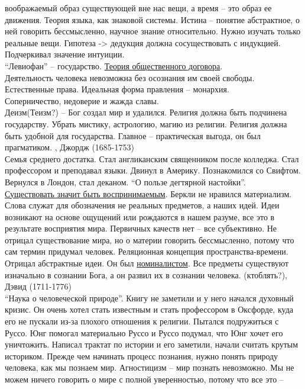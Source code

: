 \documentclass[a4paper,12pt]{report} %
\begin{document}
\begin{itemize}
  воображаемый образ существующей вне нас вещи, а время -- это образ ее
  движения. Теория языка, как знаковой системы. Истина -- понятие
  абстрактное, о ней говорить бессмысленно, научное знание
  относительно. Нужно изучать только реальные вещи. Гипотеза -> дедукция
  должна сосуществовать с индукцией. Подчеркивал значение интуиции.\\
  ``Левиофан'' -- государство. \underline{Теория общественного
    договора}.\\
  Деятельность человека невозможна без осознания им своей
  свободы. Естественные права. Идеальная форма правления -- монархия.\\
  Соперничество, недоверие и жажда славы.\\
  Деизм(Теизм?) -- Бог создал мир и удалился. Религия должна быть
  подчинена государству. Убрать мистику, астрологию, магию из
  религии. Религия должна быть удобной для государства. Главное --
  практическая выгода, он был прагматиком.
, Джордж (1685-1753)\\
  Семья среднего достатка. Стал англиканским священником после
  колледжа. Стал профессором и преподавал языки. Двинул в
  Америку. Познакомился со Свифтом. Вернулся в Лондон, стал деканом. ``О
  пользе дегтярной настойки''.\\
  \underline{Существовать значит быть воспринимаемым}. Беркли не нравился
  материализм. Слова служат для обозначения не реальных предметов, а
  наших идей. Идеи возникают на основе ощущений или рождаются в нашем
  разуме, все это в результате восприятия мира. Первичных качеств нет --
  все субъективно. Не отрицал существование мира, но о материи говорить
  бессмысленно, потому что сам термин придумал человек. Реляционная
  концепция пространства-времени. Отрицал абстрактные идеи. Он был
  \underline{номиналистом}. Все предметы существуют изначально в
  сознании Бога, а он развил их в сознании человека. 
(ктоблять?), Дэвид (1711-1776)\\
  ``Наука о человеческой природе''. Книгу не заметили и у него начался
  духовный кризис. Он очень хотел стать известным и стать профессором
  в Оксфорде, куда его не пускали из-за плохого отношения к
  религии. Пытался подружиться с Руссо. Юнг помогал материально Руссо
  и Руссо подумал, что Юнг хочет его уничтожить. Написал трактат по
  истории и его заметили, начали считать крутым историком. Прежде чем
  начинать процесс познания, нужно понять природу человека, как мы
  познаем мир. Агностицизм -- мир познать невозможно. Мы не можем
  ничего говорить о мире с полной уверенностью, потому что все это --

\end{itemize}
\end{document}
